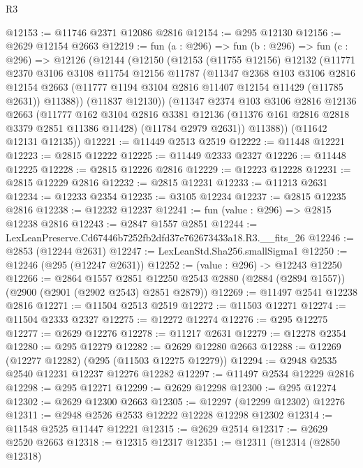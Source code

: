 \begin{lexlean}{R3}
\begin{coremodule}
@12153 := @11746 @2371 @12086 @2816
@12154 := @295 @12130
@12156 := @2629 @12154 @2663
@12219 := fun (a : @296) =>
  fun (b : @296) =>
  fun (c : @296) =>
  @12126
    (@12144
      (@12150
        (@12153
          (@11755 @12156)
          @12132
          (@11771
            @2370
            @3106
            @3108
            @11754
            @12156
            @11787
            (@11347
              @2368
              @103
              @3106
              @2816
              @12154
              @2663
              (@11777 @1194 @3104 @2816 @11407 @12154 @11429 (@11785 @2631))
              @11388))
          (@11837 @12130))
        (@11347
          @2374
          @103
          @3106
          @2816
          @12136
          @2663
          (@11777
            @162
            @3104
            @2816
            @3381
            @12136
            (@11376 @161 @2816 @2818 @3379 @2851 @11386 @11428)
            (@11784 @2979 @2631))
          @11388))
      (@11642 @12131 @12135))
@12221 := @11449 @2513 @2519
@12222 := @11448 @12221
@12223 := @2815 @12222
@12225 := @11449 @2333 @2327
@12226 := @11448 @12225
@12228 := @2815 @12226 @2816
@12229 := @12223 @12228
@12231 := @2815 @12229 @2816
@12232 := @2815 @12231
@12233 := @11213 @2631
@12234 := @12233 @2354
@12235 := @3105 @12234
@12237 := @2815 @12235 @2816
@12238 := @12232 @12237
@12241 := fun (value : @296) => @2815 @12238 @2816
@12243 := @2847 @1557 @2851
@12244 := LexLeanPreserve.Cd67446b7252fb2dfd37e762673433a18.R3.__fits_26
@12246 := @2853 (@12244 @2631)
@12247 := LexLeanStd.Sha256.smallSigma1
@12250 := @12246 (@295 (@12247 @2631))
@12252 := (value : @296) -> @12243 @12250
@12266 := @2864
    @1557
    @2851
    @12250
    @2543
    @2880
    (@2884 (@2894 @1557))
    (@2900 (@2901 (@2902 @2543) @2851 @2879))
@12269 := @11497 @2541 @12238 @2816
@12271 := @11504 @2513 @2519
@12272 := @11503 @12271
@12274 := @11504 @2333 @2327
@12275 := @12272 @12274
@12276 := @295 @12275
@12277 := @2629 @12276
@12278 := @11217 @2631
@12279 := @12278 @2354
@12280 := @295 @12279
@12282 := @2629 @12280 @2663
@12288 := @12269 (@12277 @12282) (@295 (@11503 @12275 @12279))
@12294 := @2948 @2535 @2540 @12231 @12237 @12276 @12282
@12297 := @11497 @2534 @12229 @2816
@12298 := @295 @12271
@12299 := @2629 @12298
@12300 := @295 @12274
@12302 := @2629 @12300 @2663
@12305 := @12297 (@12299 @12302) @12276
@12311 := @2948 @2526 @2533 @12222 @12228 @12298 @12302
@12314 := @11548 @2525 @11447 @12221
@12315 := @2629 @2514
@12317 := @2629 @2520 @2663
@12318 := @12315 @12317
@12351 := @12311
    (@12314
      (@2850 @12318)

\end{coremodule}
\end{lexlean}
